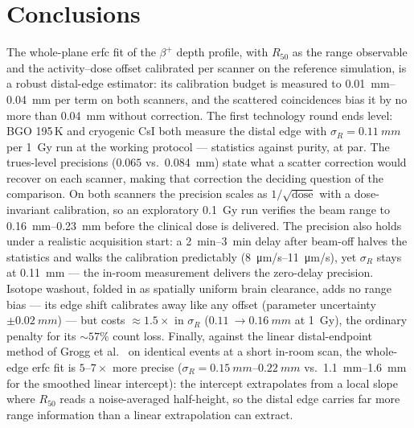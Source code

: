 \documentclass[11pt]{article}
\newcommand{\Rfifty}{R_{50}}
\begin{document}
\section*{Conclusions}

The whole-plane erfc fit of the $\beta^+$ depth profile, with $\Rfifty$ as
the range observable and the activity--dose offset calibrated per scanner
on the reference simulation, is a robust distal-edge estimator: its
calibration budget is measured to \SIrange{0.01}{0.04}{mm} per term on
both scanners, and the scattered coincidences bias it by no more than
\SI{0.04}{mm} without correction. The first technology round ends level:
BGO 195\,K and cryogenic CsI both measure the distal edge with
$\sigma_R = \SI{0.11}{mm}$ per \SI{1}{Gy} run at the working protocol ---
statistics against purity, at par. The trues-level precisions ($0.065$
vs.\ \SI{0.084}{mm}) state what a scatter correction would recover on each
scanner, making that correction the deciding question of the comparison.
On both scanners the precision scales as $1/\sqrt{\text{dose}}$ with a
dose-invariant calibration, so an exploratory \SI{0.1}{Gy} run verifies
the beam range to \SIrange{0.16}{0.23}{mm} before the clinical dose is
delivered. The precision also holds under a realistic acquisition start:
a \SIrange{2}{3}{min} delay after beam-off halves the statistics and
walks the calibration predictably (\SIrange{8}{11}{\micro m/s}), yet
$\sigma_R$ stays at \SI{0.11}{mm} --- the in-room measurement delivers
the zero-delay precision. Isotope washout, folded in as spatially uniform
brain clearance, adds no range bias --- its edge shift calibrates away like
any offset (parameter uncertainty $\pm\SI{0.02}{mm}$) --- but costs
$\approx 1.5\times$ in $\sigma_R$ ($\SI{0.11}{}\to\SI{0.16}{mm}$ at
\SI{1}{Gy}), the ordinary penalty for its $\sim\!57\%$ count loss. Finally,
against the linear distal-endpoint method of Grogg et al.~\cite{grogg2013} on
identical events at a short in-room scan, the whole-edge erfc fit is
$5$--$7\times$ more precise ($\sigma_R = \SIrange{0.15}{0.22}{mm}$ vs.\
\SIrange{1.1}{1.6}{mm} for the smoothed linear intercept): the intercept
extrapolates from a local slope where $\Rfifty$ reads a noise-averaged
half-height, so the distal edge carries far more range information than a linear
extrapolation can extract.



\end{document}
